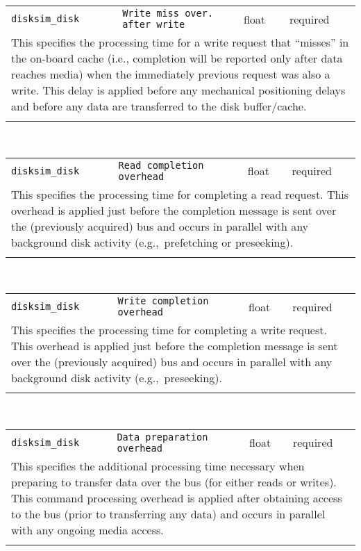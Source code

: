 \noindent 
\begin{tabular}{|p{1.5in}|p{3.5in}|p{0.5in}|p{0.5in}|}
\cline{1-4}
\texttt{disksim\_disk} & \texttt{Write miss over. after write} & float & required \\ 
\cline{1-4}
\multicolumn{4}{|p{6in}|}{
This specifies the processing time for a write request that ``misses'' in
the on-board cache (i.e., completion will be reported only after data
reaches media) when the immediately previous request was also a write.
This delay is applied before any mechanical positioning delays and
before any data are transferred to the disk buffer/cache.
}\\ 
\cline{1-4}
\multicolumn{4}{p{5in}}{}\\
\end{tabular}\\ 
\noindent 
\begin{tabular}{|p{1.5in}|p{3.5in}|p{0.5in}|p{0.5in}|}
\cline{1-4}
\texttt{disksim\_disk} & \texttt{Read completion overhead} & float & required \\ 
\cline{1-4}
\multicolumn{4}{|p{6in}|}{
This specifies the processing time for completing a read request.
This overhead is applied just before the completion message is sent
over the (previously acquired) bus and occurs in parallel with any
background disk activity (e.g.,~prefetching or preseeking).
}\\ 
\cline{1-4}
\multicolumn{4}{p{5in}}{}\\
\end{tabular}\\ 
\noindent 
\begin{tabular}{|p{1.5in}|p{3.5in}|p{0.5in}|p{0.5in}|}
\cline{1-4}
\texttt{disksim\_disk} & \texttt{Write completion overhead} & float & required \\ 
\cline{1-4}
\multicolumn{4}{|p{6in}|}{
This specifies the processing time for completing a write request.
This overhead is applied just before the completion message is sent
over the (previously acquired) bus and occurs in parallel with any
background disk activity (e.g.,~preseeking).
}\\ 
\cline{1-4}
\multicolumn{4}{p{5in}}{}\\
\end{tabular}\\ 
\noindent 
\begin{tabular}{|p{1.5in}|p{3.5in}|p{0.5in}|p{0.5in}|}
\cline{1-4}
\texttt{disksim\_disk} & \texttt{Data preparation overhead} & float & required \\ 
\cline{1-4}
\multicolumn{4}{|p{6in}|}{
This specifies the additional processing time necessary when preparing to
transfer data over the bus (for either reads or writes). This command
processing overhead is applied after obtaining access to the bus
(prior to transferring any data) and occurs in parallel with any
ongoing media access.
}\\ 
\cline{1-4}
\multicolumn{4}{p{5in}}{}\\
\end{tabular}\\ 
